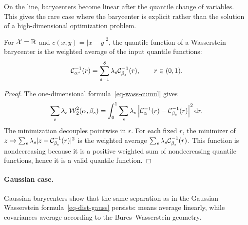 On the line, barycenters become linear after the quantile change of variables. This gives the rare case where the barycenter is explicit rather than the solution of a high-dimensional optimization problem.

\begin{prop}\label{prop-quantile-barycenters}
	For $\mathcal{X}=\mathbb{R}$ and $c(x,y)=|x-y|^2$, the quantile function of a Wasserstein barycenter is the weighted average of the input quantile functions:
	\[
		\mathcal{C}_{\alpha^\star}^{-1}(r)
		=
		\sum_{s=1}^S\lambda_s\mathcal{C}_{\beta_s}^{-1}(r),
		\qquad r\in(0,1).
	\]
\end{prop}

\begin{proof}
	The one-dimensional formula~\eqref{eq-wass-cumul} gives
	\[
		\sum_s\lambda_s\operatorname{\mathcal{W}}_2^2(\alpha,\beta_s)
		=
		\int_0^1
		\sum_s\lambda_s
		\left\lvert\mathcal{C}_{\alpha}^{-1}(r)-\mathcal{C}_{\beta_s}^{-1}(r)\right\rvert^2
		\mathrm{d} r.
	\]
	The minimization decouples pointwise in $r$. For each fixed $r$, the minimizer of $z\mapsto\sum_s\lambda_s|z-\mathcal{C}_{\beta_s}^{-1}(r)|^2$ is the weighted average $\sum_s\lambda_s\mathcal{C}_{\beta_s}^{-1}(r)$. This function is nondecreasing because it is a positive weighted sum of nondecreasing quantile functions, hence it is a valid quantile function.
\end{proof}


\paragraph{Gaussian case.}

Gaussian barycenters show that the same separation as in the Gaussian Wasserstein formula~\eqref{eq-dist-gauss} persists: means average linearly, while covariances average according to the Bures--Wasserstein geometry.

